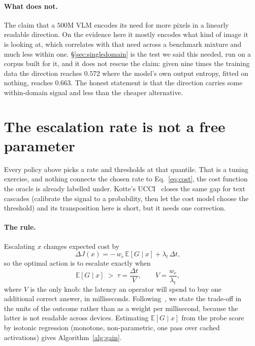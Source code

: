 \documentclass[10pt,twocolumn]{article}
\theoremstyle{plain}
\begin{document}
\paragraph{What does not.} The claim that a $500$M VLM encodes its need for more
pixels in a linearly readable direction. On the evidence here it mostly encodes
what kind of image it is looking at, which correlates with that need across a
benchmark mixture and much less within one. \S\ref{sec:singledomain} is the
test we said this needed, run on a corpus built for it, and it does not rescue
the claim: given nine times the training data the direction reaches $0.572$
where the model's own output entropy, fitted on nothing, reaches $0.663$. The
honest statement is that the direction carries some within-domain signal and
less than the cheaper alternative.

\section{The escalation rate is not a free parameter}
\label{sec:rule}

Every policy above picks a rate and thresholds at that quantile. That is a
tuning exercise, and nothing connects the chosen rate to Eq.~\ref{eq:cost}, the
cost function the oracle is already labelled under. Kotte's UCCI~\cite{ucci}
closes the same gap for text cascades (calibrate the signal to a probability, then let the cost model choose the threshold) and its transposition here is
short, but it needs one correction.

\paragraph{The rule.} Escalating $x$ changes expected cost by
\begin{equation}
\Delta J(x) = -\,w_e\,\mathbb{E}[G \mid x] + \lambda_t\,\Delta t,
\label{eq:deltaj}
\end{equation}
so the optimal action is to escalate exactly when
\begin{equation}
\mathbb{E}[G \mid x] \;>\; \tau = \frac{\Delta t}{V},
\qquad V = \frac{w_e}{\lambda_t},
\label{eq:breakeven}
\end{equation}
where $V$ is the only knob: the latency an operator will spend to buy one
additional correct answer, in milliseconds. Following~\cite{clusterroute}, we
state the trade-off in the units of the outcome rather than as a weight per
millisecond, because the latter is not readable across devices. Estimating
$\mathbb{E}[G \mid x]$ from the probe score by isotonic regression (monotone, non-parametric, one pass over cached activations) gives Algorithm~\ref{alg:gain}.
\end{document}
